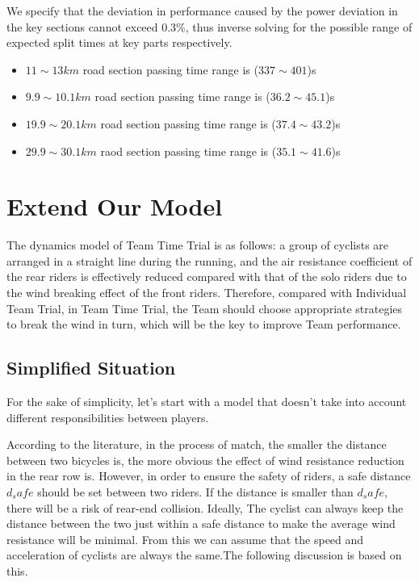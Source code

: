 \documentclass{mcmthesis}
\begin{document}
We specify that the deviation in performance caused by the power deviation in the key sections cannot exceed 0.3\%, thus inverse solving for the possible range of expected split times at key parts respectively.
\begin{itemize}
	\item $11\sim 13km$ road section passing time range is ($337\sim 401$)s
	\item $9.9\sim 10.1km$ road section passing time range is ($36.2\sim 45.1$)s
	\item $19.9\sim 20.1km$ road section passing time range is ($37.4\sim 43.2$)s
	\item $29.9\sim 30.1km$ raod section passing time range is ($35.1\sim 41.6$)s
\end{itemize}






\section{Extend Our Model}
The dynamics model of Team Time Trial is as follows: a group of cyclists are arranged in a straight line during the running, and the air resistance coefficient of the rear riders is effectively reduced compared with that of the solo riders due to the wind breaking effect of the front riders. Therefore, compared with Individual Team Trial, in Team Time Trial, the Team should choose appropriate strategies to break the wind in turn, which will be the key to improve Team performance.

\subsection{Simplified Situation}
For the sake of simplicity, let's start with a model that doesn't take into account different responsibilities between players.

According to the literature, in the process of match, the smaller the distance between two bicycles is, the more obvious the effect of wind resistance reduction in the rear row is. However, in order to ensure the safety of riders, a safe distance $d_safe$ should be set between two riders. If the distance is smaller than $d_safe$, there will be a risk of rear-end collision. Ideally, The cyclist can always keep the distance between the two just within a safe distance to make the average wind resistance will be minimal. From this we can assume that the speed and acceleration of cyclists are always the same.The following discussion is based on this.
\end{document}
